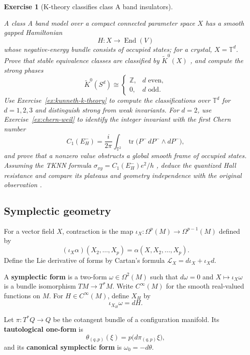 \documentclass{article}
\newtheorem{exercise}{Exercise}
\newcommand{\End}{\operatorname{End}}
\begin{document}
\begin{exercise}[K-theory classifies class A band insulators]\label{ex:class-a-insulators}\leavevmode\par
\textit{A class A band model over a compact connected parameter space $X$
has a smooth gapped Hamiltonian}
\[
H:X\longrightarrow\End(V)
\]
\textit{whose negative-energy bundle consists of occupied states; for a
crystal, $X=\mathbb T^d$. Prove that
stable equivalence classes are classified by $\widetilde K^0(X)$
\cite{kitaev-periodic}, and compute the strong phases}
\[
\widetilde K^0(S^d)
\cong
\begin{cases}
\mathbb Z,&d\text{ even},\\
0,&d\text{ odd}.
\end{cases}
\]
\textit{Use Exercise~\ref{ex:kunneth-k-theory} to compute the classifications
over $\mathbb T^d$ for $d=1,2,3$ and distinguish strong from weak invariants.}
\textit{For $d=2$, use Exercise~\ref{ex:chern-weil} to identify the integer
invariant with the first Chern number}
\[
C_1(E_H^-)
=\frac{i}{2\pi}\int_{\mathbb T^2}
\operatorname{tr}\bigl(P^-\,dP^-\wedge dP^-\bigr),
\]
\textit{and prove that a nonzero value obstructs a global smooth frame of
occupied states. Assuming the TKNN formula
$\sigma_{xy}=C_1(E_H^-)e^2/h$ \cite{tknn}, deduce the quantized Hall resistance and
compare its plateaus and geometry independence with the original observation
\cite{von-klitzing-qhe}.}
\end{exercise}

\subsection{Symplectic geometry}

For a vector field $X$, contraction is the map $\iota_X:\Omega^p(M)\to\Omega^{p-1}(M)$ defined by
\[
(\iota_X\alpha)(X_2,\ldots,X_p)=\alpha(X,X_2,\ldots,X_p).
\]
Define the Lie derivative of forms by Cartan's formula
$\mathcal{L}_X=d\iota_X+\iota_Xd$.

A \textbf{symplectic form} is a two-form $\omega\in\Omega^2(M)$ such that $d\omega=0$ and $X\mapsto\iota_X\omega$ is a bundle isomorphism $TM\to T^*M$. Write $C^\infty(M)$ for the smooth real-valued functions on $M$. For $H\in C^\infty(M)$, define $X_H$ by
\[
\iota_{X_H}\omega=dH.
\]

Let $\pi:T^*Q\to Q$ be the cotangent bundle of a configuration manifold. Its \textbf{tautological one-form} is
\[
\theta_{(q,p)}(\xi)=p\bigl(d\pi_{(q,p)}\xi\bigr),
\]
and its \textbf{canonical symplectic form} is $\omega_0=-d\theta$.
\end{document}
